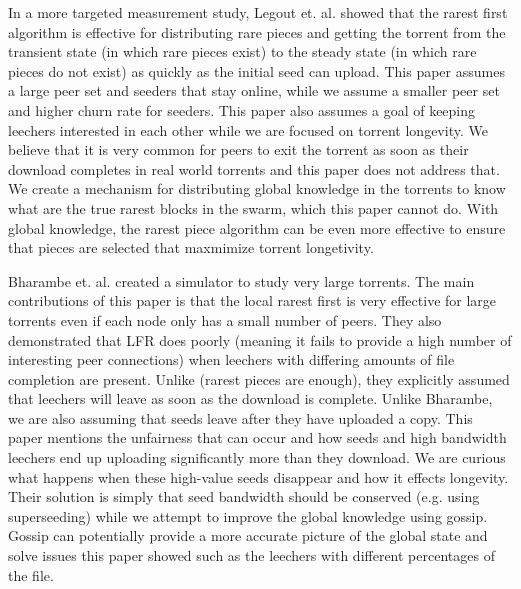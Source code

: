 In a more targeted measurement study, Legout et. al. \cite{legout:1} showed
that the rarest first algorithm is effective for distributing rare
pieces and getting the torrent from the transient state (in which
rare pieces exist) to the steady state (in which rare pieces do not
exist) as quickly as the initial seed can upload. This paper assumes
a large peer set and seeders that stay online, while we assume a
smaller peer set and higher churn rate for seeders. This paper also
assumes a goal of keeping leechers interested in each other while we
are focused on torrent longevity. We believe that it is very common
for peers to exit the torrent as soon as their download completes in
real world torrents and this paper does not address that. We create
a mechanism for distributing global knowledge in the torrents to
know what are the true rarest blocks in the swarm, which this paper
cannot do. With global knowledge, the rarest piece algorithm can be
even more effective to ensure that pieces are selected that maxmimize
torrent longetivity.  

Bharambe et. al. \cite{bharambe} created a simulator to
study very large torrents. The main contributions of this paper is
that the local rarest first is very effective for large torrents even
if each node only has a small number of peers. They also demonstrated
that LFR does poorly (meaning it fails to provide a high number of
interesting peer connections) when leechers with differing amounts
of file completion are present. Unlike (rarest pieces are enough),
they explicitly assumed that leechers will leave as soon as the
download is complete. Unlike Bharambe, we are also assuming that seeds
leave after they have uploaded a copy. This paper mentions the
unfairness that can occur and how seeds and high bandwidth leechers
end up uploading significantly more than they download. We are
curious what happens when these high-value seeds disappear and how
it effects longevity. Their solution is simply that seed bandwidth
should be conserved (e.g. using superseeding) while we attempt to
improve the global knowledge using gossip. Gossip can potentially
provide a more accurate picture of the global state and solve issues
this paper showed such as the leechers with different percentages of
the file.  

